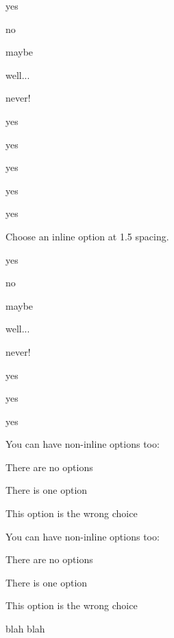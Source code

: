\documentclass{ouicma}
\begin{document}
\begin{inlineoptions}{5}%
\item yes
\item no
\item maybe
\item well...
\item never!
\item yes
\item yes
\item yes
\item yes
\item yes\answerbox
\end{inlineoptions}

\question
Choose an inline option at 1.5 spacing.
\begin{inlineoptions}[1.5]{3} %
\item yes
\item no
\item maybe
\item well...
\item never!
\item yes
\item yes
\item yes
\noitem %
\end{inlineoptions}

\question
You can have non-inline options too:
\begin{options}
\item There are no options
\item There is one option
\item This option is the wrong choice\answerbox
\end{options}


\question
You can have non-inline options too:
\begin{options}
\item There are no options
\item There is one option
\item This option is the wrong choice\answerbox
\end{options}

blah blah 
\end{document}
